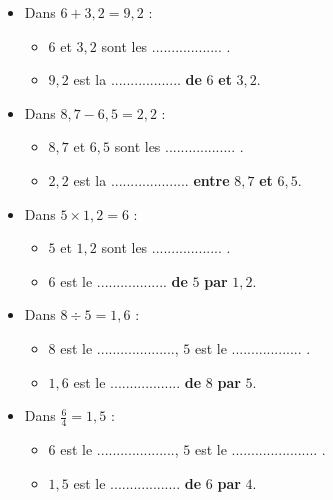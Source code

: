 \documentclass[a4paper]{article}
\begin{document}
\begin{exemple}
	\begin{itemize}
		\item Dans $6 + 3,2 = 9,2$ :
		      \begin{itemize}
			      \item $6$ et $3,2$ sont les .................. .
			      \item $9,2$ est la .................. \textbf{de} $6$ \textbf{et} $3,2$.
		      \end{itemize}
		\item Dans $8,7 - 6,5 = 2,2$ :
		      \begin{itemize}
			      \item $8,7$ et $6,5$ sont les .................. .
			      \item $2,2$ est la .................... \textbf{entre} $8,7$ \textbf{et} $6,5$.
		      \end{itemize}
		\item Dans $5 × 1,2 = 6$ :
		      \begin{itemize}
			      \item $5$ et $1,2$ sont les .................. .
			      \item $6$ est le .................. \textbf{de} $5$ \textbf{par} $1,2$.
		      \end{itemize}
		\item Dans $8 ÷ 5 = 1,6$ :
		      \begin{itemize}
			      \item $8$ est le ...................., $5$ est le .................. .
			      \item $1,6$ est le .................. \textbf{de} $8$ \textbf{par} $5$.
		      \end{itemize}
		\item Dans $\frac{6}{4} = 1,5$ :
		      \begin{itemize}
			      \item $6$ est le ...................., $5$ est le ...................... .
			      \item $1,5$ est le .................. \textbf{de} $6$ \textbf{par} $4$.
		      \end{itemize}
	\end{itemize}
\end{exemple}
\end{document}
